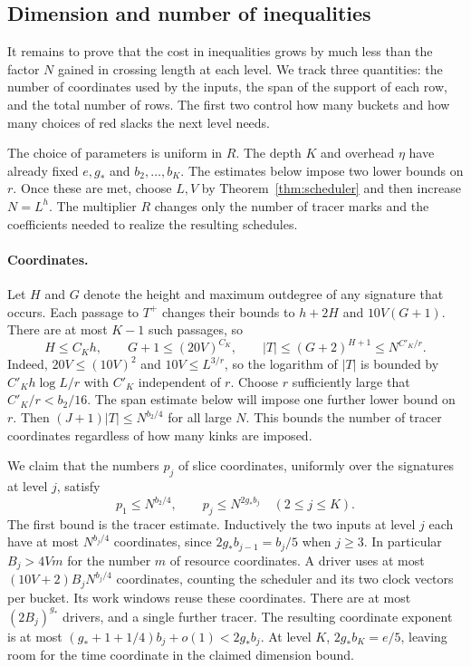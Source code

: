 \subsection{Dimension and number of inequalities}
It remains to prove that the cost in inequalities grows by much less
than the factor $N$ gained in crossing length at each level. We track
three quantities: the number of coordinates used by the inputs, the span
of the support of each row, and the total number of rows. The first two
control how many buckets and how many choices of red slacks the next
level needs.

The choice of parameters is uniform in $R$. The depth $K$ and overhead
$\eta$ have already fixed $e,g_*$ and $b_2,\ldots,b_K$. The estimates
below impose two lower bounds on $r$. Once these are met, choose $L,V$
by Theorem~\ref{thm:scheduler} and then increase $N=L^h$. The multiplier
$R$ changes only the number of tracer marks and the coefficients needed
to realize the resulting schedules.

\paragraph{Coordinates.}
Let $H$ and $G$ denote the height and maximum outdegree of any signature
that occurs. Each passage to $T^+$ changes their bounds to $h+2H$ and
$10V(G+1)$. There are at most $K-1$ such passages, so
\[
 H\le C_K h,\qquad G+1\le(20V)^{C_K},\qquad
 |T|\le (G+2)^{H+1}\le N^{C'_K/r}.
\]
Indeed, $20V\le(10V)^2$ and $10V\le L^{3/r}$, so the logarithm of
$|T|$ is bounded by $C'_K h\log L/r$ with $C'_K$ independent of $r$.
Choose $r$ sufficiently large that $C'_K/r<b_2/16$. The span estimate below
will impose one further lower bound on $r$. Then $(J+1)|T|\le N^{b_2/4}$ for all
large $N$. This bounds the number of tracer coordinates regardless of
how many kinks are imposed.

We claim that the numbers $p_j$ of slice coordinates, uniformly over the
signatures at level $j$, satisfy
\[
     p_1\le N^{b_2/4},\qquad
     p_j\le N^{2g_* b_j}\quad(2\le j\le K).
\]
The first bound is the tracer estimate. Inductively the two inputs at
level $j$ each have at most $N^{b_j/4}$ coordinates, since
$2g_* b_{j-1}=b_j/5$ when $j\ge3$. In particular $B_j>4Vm$ for the
number $m$ of resource coordinates. A driver uses at most
$(10V+2) B_j N^{b_j/4}$ coordinates, counting the scheduler and its two
clock vectors per bucket. Its work windows reuse these coordinates.
There are at most $(2B_j)^{g_*}$ drivers, and a single further tracer.
The resulting coordinate exponent is at most
$(g_*+1+1/4)b_j+o(1)<2g_*b_j$. At level $K$, $2g_* b_K=e/5$, leaving
room for the time coordinate in the claimed dimension bound.

